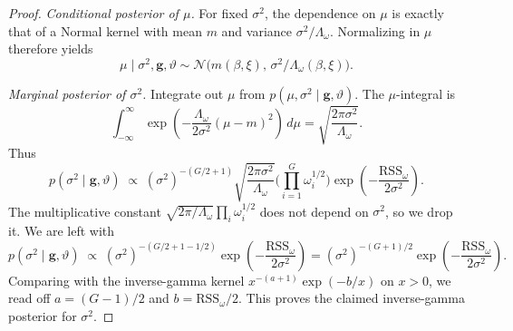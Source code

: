 \begin{proof}
\emph{Conditional posterior of \(\mu\).}  
For fixed \(\sigma^2\), the dependence on \(\mu\) is exactly that of a Normal kernel with mean \(m\) and variance \(\sigma^2/\Lambda_\omega\).
Normalizing in \(\mu\) therefore yields
\[
\mu\mid\sigma^2,\mathbf g,\vartheta
\sim \mathcal N\!\big(m(\beta,\xi),\,\sigma^2/\Lambda_\omega(\beta,\xi)\big).
\]

\emph{Marginal posterior of \(\sigma^2\).}  
Integrate out \(\mu\) from \(p(\mu,\sigma^2\mid\mathbf g,\vartheta)\).
The \(\mu\)-integral is
\[
\int_{-\infty}^{\infty}
\exp\!\left(-\frac{\Lambda_\omega}{2\sigma^2}(\mu-m)^2\right)\,d\mu
=\sqrt{\frac{2\pi\sigma^2}{\Lambda_\omega}}.
\]
Thus
\[
p(\sigma^2\mid\mathbf g,\vartheta)
\;\propto\;
(\sigma^2)^{-(G/2+1)}
\sqrt{\frac{2\pi\sigma^2}{\Lambda_\omega}}
\Bigg(\prod_{i=1}^G \omega_i^{1/2}\Bigg)
\exp\!\left(-\frac{\mathrm{RSS}_\omega}{2\sigma^2}\right).
\]
The multiplicative constant
\(\sqrt{2\pi/\Lambda_\omega}\prod_i \omega_i^{1/2}\) does not depend on \(\sigma^2\), so we drop it.
We are left with
\[
p(\sigma^2\mid\mathbf g,\vartheta)
\;\propto\;
(\sigma^2)^{-(G/2+1-1/2)}\exp\!\left(-\frac{\mathrm{RSS}_\omega}{2\sigma^2}\right)
=(\sigma^2)^{-(G+1)/2}\exp\!\left(-\frac{\mathrm{RSS}_\omega}{2\sigma^2}\right).
\]
Comparing with the inverse-gamma kernel
\(x^{-(a+1)}\exp(-b/x)\) on \(x>0\),
we read off \(a=(G-1)/2\) and \(b=\mathrm{RSS}_\omega/2\).
This proves the claimed inverse-gamma posterior for \(\sigma^2\).
\end{proof}

